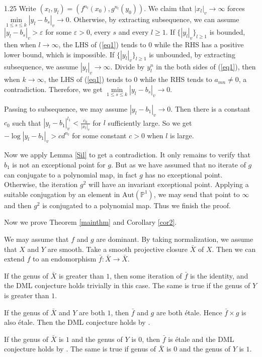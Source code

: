 \documentclass[12pt]{amsart}
\begin{document}
\begin{spacing}{1.25}
    Write $(x_l,y_l) = (f^{n_l}(x_0), g^{n_l}(y_0))$. We claim that $|x_l|_v \to \infty$ forces $\min\limits_{1\leq s \leq k}|y_l - b_s|_v \to 0$. Otherwise, by extracting subsequence, we can assume $|y_l-b_s|_v>\varepsilon$ for some $\varepsilon>0$, every $s$ and every $l\geq 1$. If $\{|y_l|_v\}_{l\geq 1}$ is bounded, then when $l\to\infty$, the LHS of (\ref{eq1}) tends to 0 while the RHS has a positive lower bound, which is impossible. If $\{|y_l|_v\}_{l\geq 1}$ is unbounded, by extracting subsequence, we assume $|y_l|_v\to\infty$. Divide by $y_l^n$ in the both sides of (\ref{eq1}), then when $k\to\infty$, the LHS of (\ref{eq1}) tends to 0 while the RHS tends to $a_{mn}\neq 0$, a contradiction. Therefore, we get $\min\limits_{1\leq s \leq k}|y_l - b_s|_v \to 0$.

    Passing to subsequence, we may assume $|y_l - b_1|_v \to 0$. Then there is a constant $c_0$ such that $|y_l-b_1|_v^{l_1} < \frac{c_0}{|x_l|_v}$ for $l$ sufficiently large. So we get $-\log |y_l - b_1|_v > cd^{n_l}$ for some constant $c>0$ when $l$ is large.
    
    Now we apply Lemma \ref{Sil} to get a contradiction. It only remains to verify that $b_1$ is not an exceptional point for $g$. But as we have assumed that no iterate of $g$ can conjugate to a polynomial map, in fact $g$ has no exceptional point. Otherwise, the iteration $g^2$ will have an invariant exceptional point. Applying a suitable conjugation by an element in $\mathrm{Aut}(\mathbb{P}^1)$, we may send that point to $\infty$ and then $g^2$ is conjugated to a polynomial map. Thus we finish the proof.
\endproof

Now we prove Theorem \ref{mainthm} and Corollary \ref{cor2}.

    We may assume that $f$ and $g$ are dominant. By taking normalization, we assume that $X$ and $Y$ are smooth. Take a smooth projective closure $\bar{X}$ of $X$. Then we can extend $f$ to an endomorphism $\bar{f}: \bar{X}\to\bar{X}$. 

    If the genus of $\bar{X}$ is greater than $1$, then some iteration of $\bar{f}$ is the identity, and the DML conjecture holds trivially in this case. The same is true if the genus of $Y$ is greater than $1$.

    If the genus of $\bar{X}$ and $Y$ are both $1$, then $\bar{f}$ and $g$ are both étale. Hence $\bar{f}\times g$ is also étale. Then the DML conjecture holds by \cite{BGT10}.

    If the genus of $\bar{X}$ is $1$ and the genus of $Y$ is $0$, then $\bar{f}$ is étale and the DML conjecture holds by \cite[Corollary 1.2]{BZ23}. The same is true if genus of $\bar{X}$ is $0$ and the genus of $Y$ is $1$.


\end{spacing}
\end{document}
